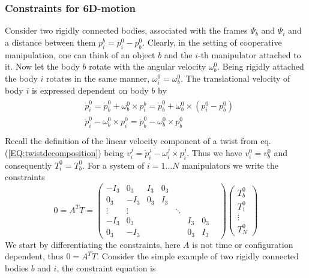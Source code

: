 \documentclass[a4paper,twoside, openright,12pt]{report}
\begin{document}
\subsubsection{Constraints for 6D-motion}  


Consider two rigidly connected bodies, associated with the frames $\Psi_b$ and $\Psi_i$ and a distance between them $p_i^b = p_i^0 - p_b^0$. Clearly, in the setting of cooperative manipulation, one can think of an object $b$ and the $i$-th manipulator attached to it. Now let the body $b$ rotate with the angular velocity $\omega_b^0$. Being rigidly attached the body $i$ rotates in the same manner, $\omega_i^0 = \omega_b^0$. The translational velocity of body $i$ is expressed dependent on body $b$ by 
\begin{eqnarray}
\begin{aligned}
&\dot{p}_i^0 = \dot{p}_b^0 + \omega_b^0 \times p_i^b = \dot{p}_b^0 + \omega_b^0 \times (p_i^0-p_b^0) \\
&\dot{p}_i^0 - \omega_b^0 \times p_i^0 = \dot{p}_b^0 - \omega_b^0 \times p_b^0 \\
\end{aligned}
\end{eqnarray}
Recall the definition of the linear velocity component of a twist from eq. (\ref{EQ:twistdecomposition}) being $v_i^j= \dot{p}_i^j - \omega_i^j \times p_i^j$. Thus we have $v_i^0 = v_b^0$ and consequently $T_i^0 = T_b^0$. For a system of $i=1...N$ manipulators we write the constraints
\begin{equation}
0 = A^T T = \begin{pmatrix}
-I_3 & 0_3 & I_3 & 0_3 & & & \\
0_3 & -I_3 & 0_3 & I_3 & & & \\
\vdots & \vdots & & & \ddots & & & \\
- I_3 & 0_3 & & & & I_3 & 0_3 \\
0_3 & -I_3 & & & & 0_3 & I_3 
\end{pmatrix}
\begin{pmatrix}
T_b^0 \\ T_1^0 \\ \vdots \\ T_N^0
\end{pmatrix}
\end{equation}
We start by differentiating the constraints, here $A$ is not time or configuration dependent, thus $0=A^T\dot{T}$. Consider the simple example of two rigidly connected bodies $b$ and $i$, the constraint equation is
\end{document}
